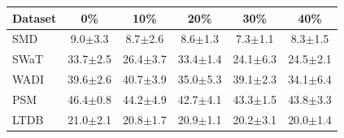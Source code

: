 \begin{tabular}{lccccc}
    \toprule
    Dataset & 0\%          & 10\%         & 20\%         & 30\%         & 40\%         \\
    \midrule
    SMD     & 9.0$\pm$3.3  & 8.7$\pm$2.6  & 8.6$\pm$1.3  & 7.3$\pm$1.1  & 8.3$\pm$1.5  \\
    SWaT    & 33.7$\pm$2.5 & 26.4$\pm$3.7 & 33.4$\pm$1.4 & 24.1$\pm$6.3 & 24.5$\pm$2.1 \\
    WADI    & 39.6$\pm$2.6 & 40.7$\pm$3.9 & 35.0$\pm$5.3 & 39.1$\pm$2.3 & 34.1$\pm$6.4 \\
    PSM     & 46.4$\pm$0.8 & 44.2$\pm$4.9 & 42.7$\pm$4.1 & 43.3$\pm$1.5 & 43.8$\pm$3.3 \\
    LTDB    & 21.0$\pm$2.1 & 20.8$\pm$1.7 & 20.9$\pm$1.1 & 20.2$\pm$3.1 & 20.0$\pm$1.4 \\
    \bottomrule
\end{tabular}
